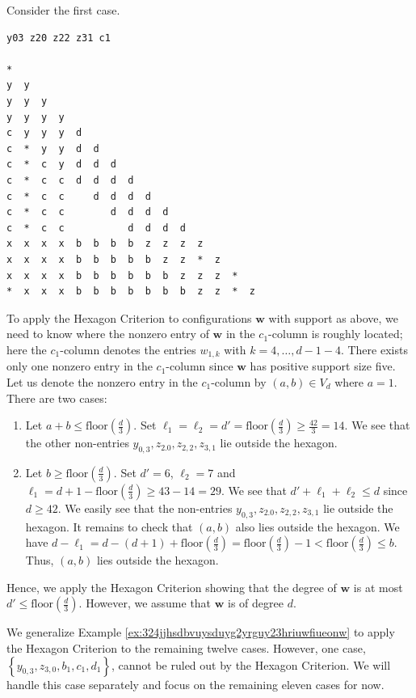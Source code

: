 \begin{example}\label{ex:324jjhsdbvuysduyg2yrguy23hriuwfiueonw}
    Consider the first case.
    
\begin{verbatim}
y03 z20 z22 z31 c1

*  
y  y  
y  y  y  
y  y  y  y  
c  y  y  y  d  
c  *  y  y  d  d  
c  *  c  y  d  d  d  
c  *  c  c  d  d  d  d  
c  *  c  c     d  d  d  d  
c  *  c  c        d  d  d  d  
c  *  c  c           d  d  d  d  
x  x  x  x  b  b  b  b  z  z  z  z  
x  x  x  x  b  b  b  b  b  z  z  *  z  
x  x  x  x  b  b  b  b  b  b  z  z  z  *  
*  x  x  x  b  b  b  b  b  b  b  z  z  *  z  
\end{verbatim}
To apply the Hexagon Criterion to configurations \( \mathbf{w} \) with support as above, we need to know where the nonzero entry of \( \mathbf{w} \) in the \( c_1 \)-column is roughly located; here the \( c_1 \)-column denotes the entries \( w_{1,k} \) with \( k = 4, \dots, d - 1 - 4 \). There exists only one nonzero entry in the \( c_1 \)-column since \( \mathbf{w} \) has positive support size five. Let us denote the nonzero entry in the \( c_1 \)-column by \( (a,b) \in V_d \) where \( a = 1 \). There are two cases:
\begin{enumerate}
    \item Let \( a + b \leq \mathrm{floor}(\frac{d}{3})\). Set \( \ell_1 = \ell_2 = d' =  \mathrm{floor}(\frac{d}{3}) \geq \frac{42}{3} = 14 \). We see that the other non-entries \( y_{0,3}, z_{2.0}, z_{2,2}, z_{3,1} \) lie outside the hexagon.
    \item Let \( b \geq \mathrm{floor}(\frac{d}{3})  \). Set \( d' = 6 \), \( \ell_2 = 7 \) and \( \ell_1 = d + 1 - \mathrm{floor}(\frac{d}{3}) \geq 43 - 14 = 29 \). We see that \( d' + \ell_1 + \ell_2 \leq d \) since \( d \geq 42 \). We easily see that the non-entries \( y_{0,3}, z_{2.0}, z_{2,2}, z_{3,1} \) lie outside the hexagon. It remains to check that \( (a,b) \) also lies outside the hexagon. We have \( d - \ell_1 = d - (d + 1) + \mathrm{floor}(\frac{d}{3}) =\mathrm{floor}(\frac{d}{3}) - 1 < \mathrm{floor}(\frac{d}{3}) \leq b \). Thus, \( (a,b) \) lies outside the hexagon.
\end{enumerate}
Hence, we apply the Hexagon Criterion showing that the degree of \( \mathbf{w} \) is at most \( d' \leq \mathrm{floor}(\frac{d}{3}) \). However, we assume that \( \mathbf{w} \) is of degree \( d \).
\end{example}

We generalize Example \ref{ex:324jjhsdbvuysduyg2yrguy23hriuwfiueonw} to apply the Hexagon Criterion to the remaining twelve cases. However, one case, \( \left\{ y_{0,3}, z_{3,0}, b_1, c_1, d_1 \right\} \), cannot be ruled out by the Hexagon Criterion. We will handle this case separately and focus on the remaining eleven cases for now.

